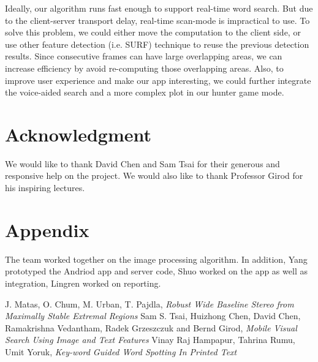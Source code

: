 \documentclass[conference]{IEEEtran}
\begin{document}
Ideally, our algorithm runs fast enough to support real-time word search. But due to the client-server transport delay, real-time scan-mode is impractical to use. To solve this problem, we could either move the computation to the client side, or use other feature detection (i.e. SURF) technique to reuse the previous detection results.  Since consecutive frames can have large overlapping areas, we can increase efficiency by avoid re-computing those overlapping areas. Also, to improve user experience and make our app interesting, we could further integrate the voice-aided search and a more complex plot in our hunter game mode.

\section*{Acknowledgment}
We would like to thank David Chen and Sam Tsai for their generous and responsive help on the project.  We would also like to thank Professor Girod for his inspiring lectures.

\section*{Appendix}
The team worked together on the image processing algorithm.  In addition, Yang prototyped the Andriod app and server code, Shuo worked on the app as well as integration, Lingren worked on reporting.

\begin{thebibliography}{1}
J. Matas, O. Chum, M. Urban, T. Pajdla, \emph{Robust Wide Baseline Stereo from Maximally Stable Extremal Regions}
Sam S. Tsai, Huizhong Chen, David Chen, Ramakrishna Vedantham, Radek Grzeszczuk and Bernd Girod, \emph{Mobile Visual Search Using Image and Text Features}
Vinay Raj Hampapur, Tahrina Rumu, Umit Yoruk, \emph{Key-word Guided Word Spotting In Printed Text}
\end{thebibliography}
\end{document}
